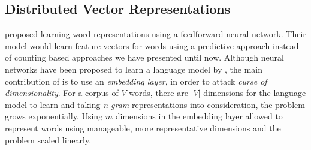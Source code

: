 \subsection{Distributed Vector Representations}%
\label{sub:distributed_vector_representations}



\textcite{bengio_neural_2003} proposed learning word representations using a feedforward neural network.
Their model would learn feature vectors for words using a predictive approach instead of counting based approaches we have presented until now.
Although neural networks have been proposed to learn a language model by \textcite{xu_can_2000}, the main contribution of \citeauthor{bengio_neural_2003} is to use an \emph{embedding layer}, in order to attack \emph{curse of dimensionality}.
For a corpus of $V$ words, there are $|V|$ dimensions for the language model to learn and taking \emph{n-gram} representations into consideration, the problem grows exponentially.
Using $m$ dimensions in the embedding layer allowed \citeauthor{bengio_neural_2003} to represent words using manageable, more representative dimensions and the problem scaled linearly.

